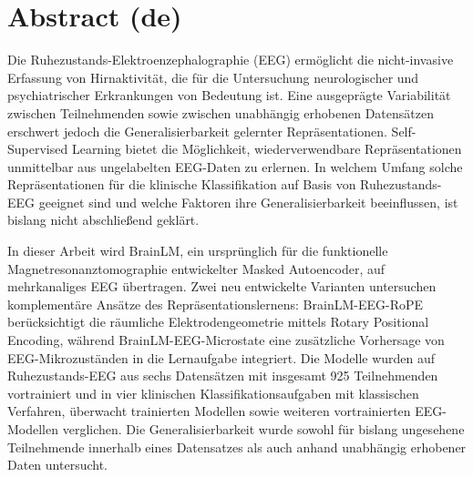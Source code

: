 \section*{Abstract (de)}
%

Die Ruhezustands-Elektroenzephalographie (EEG) ermöglicht die nicht-invasive Erfassung von Hirnaktivität, die für die Untersuchung neurologischer und psychiatrischer Erkrankungen von Bedeutung ist. Eine ausgeprägte Variabilität zwischen Teilnehmenden sowie zwischen unabhängig erhobenen Datensätzen erschwert jedoch die Generalisierbarkeit gelernter Repräsentationen. Self-Supervised Learning bietet die Möglichkeit, wiederverwendbare Repräsentationen unmittelbar aus ungelabelten EEG-Daten zu erlernen. In welchem Umfang solche Repräsentationen für die klinische Klassifikation auf Basis von Ruhezustands-EEG geeignet sind und welche Faktoren ihre Generalisierbarkeit beeinflussen, ist bislang nicht abschließend geklärt.

In dieser Arbeit wird BrainLM, ein ursprünglich für die funktionelle Magnetresonanztomographie entwickelter Masked Autoencoder, auf mehrkanaliges EEG übertragen. Zwei neu entwickelte Varianten untersuchen komplementäre Ansätze des Repräsentationslernens: BrainLM-EEG-RoPE berücksichtigt die räumliche Elektrodengeometrie mittels Rotary Positional Encoding, während BrainLM-EEG-Microstate eine zusätzliche Vorhersage von EEG-Mikrozuständen in die Lernaufgabe integriert. Die Modelle wurden auf Ruhezustands-EEG aus sechs Datensätzen mit insgesamt 925 Teilnehmenden vortrainiert und in vier klinischen Klassifikationsaufgaben mit klassischen Verfahren, überwacht trainierten Modellen sowie weiteren vortrainierten EEG-Modellen verglichen. Die Generalisierbarkeit wurde sowohl für bislang ungesehene Teilnehmende innerhalb eines Datensatzes als auch anhand unabhängig erhobener Daten untersucht.

